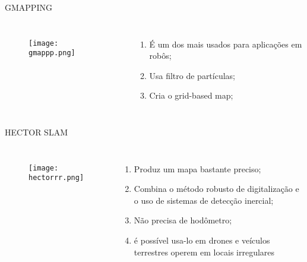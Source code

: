 \begin{frame}[c]{GMAPPING}
    \transboxout[duration=0.5]
    \begin{columns}
            \begin{figure}
            \texttt{[image: gmappp.png]}
            \caption{\cite{Sensores71}}
            \end{figure}
            \begin{enumerate}
                \item É um dos mais usados para aplicações em robôs;
                \item Usa filtro de partículas;
                \item Cria o grid-based map;     
            \end{enumerate}
    \end{columns}

\end{frame}
\begin{frame}[c]{HECTOR SLAM}
    \transboxout[duration=0.5]
    \begin{columns}
            \begin{figure}
            \texttt{[image: hectorrr.png]}
            \caption{\cite{Sensores71}}
            \end{figure}
            \begin{enumerate}
                \item Produz um mapa bastante preciso;
                \item Combina o método robusto de digitalização e o uso de sistemas de detecção inercial;
                \item Não precisa de hodômetro;  
                \item é possível usa-lo em drones e veículos terrestres operem em locais irregulares  
            \end{enumerate}
    \end{columns}


\end{frame}

